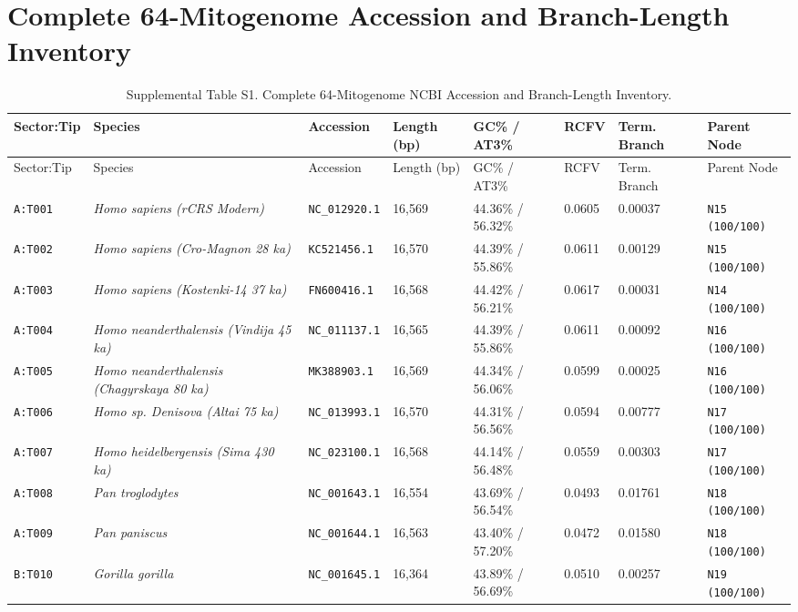 \documentclass[10pt,letterpaper]{article}
\begin{document}
\section{Complete 64-Mitogenome Accession and Branch-Length Inventory}
\footnotesize
\begin{longtable}{llllllll}
\caption{Supplemental Table S1. Complete 64-Mitogenome NCBI Accession and Branch-Length Inventory.} \\
\toprule
Sector:Tip & Species & Accession & Length (bp) & GC\% / AT3\% & RCFV & Term. Branch & Parent Node \\
\midrule
\endfirsthead
\toprule
Sector:Tip & Species & Accession & Length (bp) & GC\% / AT3\% & RCFV & Term. Branch & Parent Node \\
\midrule
\endhead
\texttt{A:T001} & \textit{Homo sapiens (rCRS Modern)} & \texttt{NC\_012920.1} & 16,569 & 44.36\% / 56.32\% & 0.0605 & 0.00037 & \texttt{N15 (100/100)} \\
\texttt{A:T002} & \textit{Homo sapiens (Cro-Magnon 28 ka)} & \texttt{KC521456.1} & 16,570 & 44.39\% / 55.86\% & 0.0611 & 0.00129 & \texttt{N15 (100/100)} \\
\texttt{A:T003} & \textit{Homo sapiens (Kostenki-14 37 ka)} & \texttt{FN600416.1} & 16,568 & 44.42\% / 56.21\% & 0.0617 & 0.00031 & \texttt{N14 (100/100)} \\
\texttt{A:T004} & \textit{Homo neanderthalensis (Vindija 45 ka)} & \texttt{NC\_011137.1} & 16,565 & 44.39\% / 55.86\% & 0.0611 & 0.00092 & \texttt{N16 (100/100)} \\
\texttt{A:T005} & \textit{Homo neanderthalensis (Chagyrskaya 80 ka)} & \texttt{MK388903.1} & 16,569 & 44.34\% / 56.06\% & 0.0599 & 0.00025 & \texttt{N16 (100/100)} \\
\texttt{A:T006} & \textit{Homo sp. Denisova (Altai 75 ka)} & \texttt{NC\_013993.1} & 16,570 & 44.31\% / 56.56\% & 0.0594 & 0.00777 & \texttt{N17 (100/100)} \\
\texttt{A:T007} & \textit{Homo heidelbergensis (Sima 430 ka)} & \texttt{NC\_023100.1} & 16,568 & 44.14\% / 56.48\% & 0.0559 & 0.00303 & \texttt{N17 (100/100)} \\
\texttt{A:T008} & \textit{Pan troglodytes} & \texttt{NC\_001643.1} & 16,554 & 43.69\% / 56.54\% & 0.0493 & 0.01761 & \texttt{N18 (100/100)} \\
\texttt{A:T009} & \textit{Pan paniscus} & \texttt{NC\_001644.1} & 16,563 & 43.40\% / 57.20\% & 0.0472 & 0.01580 & \texttt{N18 (100/100)} \\
\texttt{B:T010} & \textit{Gorilla gorilla} & \texttt{NC\_001645.1} & 16,364 & 43.89\% / 56.69\% & 0.0510 & 0.00257 & \texttt{N19 (100/100)} \\

\end{longtable}
\end{document}
